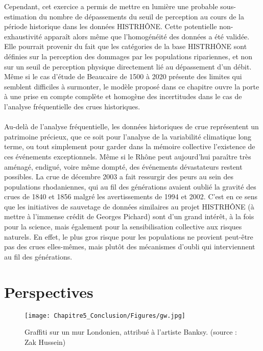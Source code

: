 Cependant, cet exercice a permis de mettre en lumière une probable sous-estimation du nombre de dépassements du seuil de perception au cours de la période historique dans les données HISTRHÔNE. Cette potentielle non-exhaustivité apparaît alors même que l'homogénéité des données a été validée. Elle pourrait provenir du fait que les catégories de la base HISTRHÔNE sont définies sur la perception des dommages par les populations ripariennes, et non sur un seuil de perception physique directement lié au dépassement d'un débit. Même si le cas d'étude de Beaucaire de 1500 à 2020 présente des limites qui semblent difficiles à surmonter, le modèle proposé dans ce chapitre ouvre la porte à une prise en compte complète et homogène des incertitudes dans le cas de l'analyse fréquentielle des crues historiques. 
	
	\paragraph{} Au-delà de l'analyse fréquentielle, les données historiques de crue représentent un patrimoine précieux, que ce soit pour l'analyse de la variabilité climatique long terme, ou tout simplement pour garder dans la mémoire collective l'existence de ces événements exceptionnels. Même si le Rhône peut aujourd'hui paraître très aménagé, endigué, voire même dompté, des événements dévastateurs restent possibles. La crue de décembre 2003 a fait ressurgir des peurs au sein des populations rhodaniennes, qui au fil des générations avaient oublié la gravité des crues de 1840 et 1856 malgré les avertissements de 1994 et 2002. C'est en ce sens que les initiatives de sauvetage de données similaires au projet HISTRHÔNE (à mettre à l'immense crédit de Georges Pichard) sont d'un grand intérêt, à la fois pour la science, mais également pour la sensibilisation collective aux risques naturels. En effet, le plus gros risque pour les populations ne provient peut-être pas des crues elles-mêmes, mais plutôt des mécanismes d'oubli qui interviennent au fil des générations.
	
	\section{Perspectives}
	
	\begin{figure}[h!]
	\centering
		\texttt{[image: Chapitre5\_Conclusion/Figures/gw.jpg]}
        \caption{Graffiti sur un mur Londonien, attribué à l'artiste Banksy. (source : Zak Hussein)}	
		\label{fig:gw}
	\end{figure}
		

